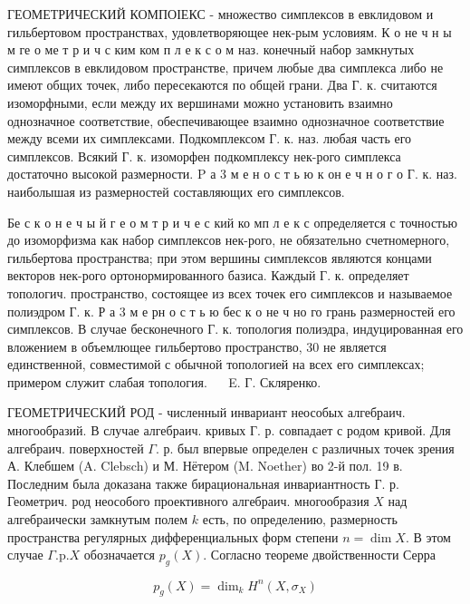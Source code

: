 \documentclass[10pt]{article}
\begin{document}
ГЕОМЕТРИЧЕСКИЙ КОМПОІЕКС - множество симплексов в евклидовом и гильбертовом пространствах, удовлетворяющее нек-рым условиям. К о не ч н ы м ге о ме т р и ч с ким ком п л е к с о м наз. конечный набор замкнутых симплексов в евклидовом пространстве, причем любые два симплекса либо не имеют общих точек, либо пересекаются по общей грани. Два Г. к. считаются изоморфными, если между их вершинами можно установить взаимно однозначное соответствие, обеспечивающее взаимно однозначное соответствие между всеми их симплексами. Подкомплексом Г. к. наз. любая часть его симплексов. Всякий Г. к. изоморфен подкомплексу нек-рого симплекса достаточно высокой размерности. $\mathrm{P}$ а 3 м е н о с т ь ю к он е ч н о г о Г. к. наз. наиболышая из размерностей составляющих его симплексов.



Бе с к о н е ч ы й г е о м т р и ч е с кий ко мп л е к с определяется с точностью до изоморфизма как набор симплексов нек-рого, не обязательно счетномерного, гильбертова пространства; при этом вершины симплексов являются концами векторов нек-рого ортонормированного базиса. Каждый Г. к. определяет топологич. пространство, состоящее из всех точек его симплексов и называемое полиэдром Г. к. Р а 3 м е рн о с т ь ю бес к о не ч но го грань размерностей его симплексов. В случае бесконечного Г. к. топология полиэдра, индуцированная его вложением в объемлющее гильбертово пространство, 30 не является единственной, совместимой с обычной топологией на всех его симплексах; примером служит слабая топология. $\quad$ E. Г. Скляренко.



ГЕОМЕТРИЧЕСКИЙ РОД - численный инвариант неособых алгебраич. многообразий. В случае алгебраич. кривых Г. р. совпадает с родом кривой. Для алгебраич. поверхностей $\Gamma$. р. был впервые определен с различных точек зрения А. Клебшем (A. Clebsch) и М. Нётером (M. Noether) во 2-й пол. 19 в. Последним была доказана также бирациональная инвариантность $Г$. р. Геометрич. род неособого проективного алгебраич. многообразия $X$ над алгебраически замкнутым полем $k$ есть, по определению, размерность пространства регулярных дифференциальных форм степени $n=\operatorname{dim} X$. В этом случае $\Gamma . \mathrm{p} . X$ обозначается $p_{g}(X)$. Согласно теореме двойственности Серра



\[

p_{g}(X)=\operatorname{dim}_{k} H^{n}\left(X, \sigma_{X}\right)

\]
\end{document}
